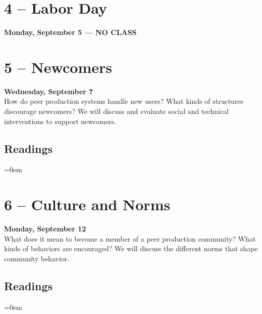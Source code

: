 \documentclass[10pt]{memoir}
\newenvironment{readinglist}{
\begin{list}{}{\leftmargin=8pt \itemindent=0em}
  \setlength{\itemsep}{8pt}
  \setlength{\parskip}{0em}
  \setlength{\parsep}{1em}
  \setlength{\parindent}{8em}}
{\end{list}}
\begin{document}
\section{4 -- Labor Day}
\textcolor{CUGold}{\textbf{Monday, September 5 --- NO CLASS}}\\

\section{5 -- Newcomers}
\textcolor{CUGold}{\textbf{Wednesday, September 7}}\\
How do peer production systems handle new users? What kinds of structures discourage newcomers? We will discuss and evaluate social and technical interventions to support newcomers.

    \subsection{Readings}
    \begin{readinglist}
        \item {}
        \item {}
        \item {}
    \end{readinglist}

\section{6 -- Culture and Norms}
\textcolor{CUGold}{\textbf{Monday, September 12}}\\
What does it mean to become a member of a peer production community? What kinds of behaviors are encouraged? We will discuss the different norms that shape community behavior.

    \subsection{Readings}
    \begin{readinglist}
        \item {}
        \item {}
        \item {}
    \end{readinglist}
\end{document}

